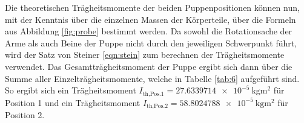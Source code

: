 Die theoretischen Trägheitsmomente der beiden Puppenpositionen können nun, mit der Kenntnis über die einzelnen Massen der Körperteile, über die Formeln aus Abbildung \ref{fig:probe} bestimmt werden. 
Da sowohl die Rotationsache der Arme als auch Beine der Puppe nicht durch den jeweiligen Schwerpunkt führt, wird der Satz von Steiner
\eqref{eqn:stein} zum berechnen der Trägheitsmomente verwendet. Das Gesamtträgheitsmoment der Puppe ergibt sich dann über die Summe aller Einzelträgheitsmomente, welche in Tabelle \ref{tab:6} aufgeführt sind.
So ergibt sich ein Trägheitsmoment $I_{\text{th,Pos.1}}=\SI{27.6339714e-5}{\kilo\gram\square\m}$ für Position 1 und ein Trägheitsmoment
$I_{\text{th,Pos.2}}=\SI{58.8024788e-5}{\kilo\gram\square\m}$ für Position 2.
%
